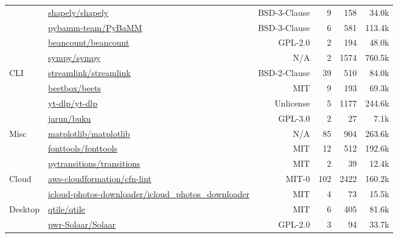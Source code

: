 {\begin{tabular}{llrrrr}
& \href{https://github.com/shapely/shapely}{shapely/shapely} & BSD-3-Clause & 9 & 158 & 34.0k \\
& \href{https://github.com/pybamm-team/PyBaMM}{pybamm-team/PyBaMM} & BSD-3-Clause & 6 & 581 & 113.4k \\
& \href{https://github.com/beancount/beancount}{beancount/beancount} & GPL-2.0 & 2 & 194 & 48.0k \\
& \href{https://github.com/sympy/sympy}{sympy/sympy} & N/A & 2 & 1574 & 760.5k \\
\midrule
\multirow{4}{*}{CLI} & \href{https://github.com/streamlink/streamlink}{streamlink/streamlink} & BSD-2-Clause & 39 & 510 & 84.0k \\
& \href{https://github.com/beetbox/beets}{beetbox/beets} & MIT & 9 & 193 & 69.3k \\
& \href{https://github.com/yt-dlp/yt-dlp}{yt-dlp/yt-dlp} & Unlicense & 5 & 1177 & 244.6k \\
& \href{https://github.com/jarun/buku}{jarun/buku} & GPL-3.0 & 2 & 27 & 7.1k \\
\midrule
\multirow{3}{*}{Misc} & \href{https://github.com/matplotlib/matplotlib}{matplotlib/matplotlib} & N/A & 85 & 904 & 263.6k \\
& \href{https://github.com/fonttools/fonttools}{fonttools/fonttools} & MIT & 12 & 512 & 192.6k \\
& \href{https://github.com/pytransitions/transitions}{pytransitions/transitions} & MIT & 2 & 39 & 12.4k \\
\midrule
\multirow{2}{*}{Cloud} & \href{https://github.com/aws-cloudformation/cfn-lint}{aws-cloudformation/cfn-lint} & MIT-0 & 102 & 2422 & 160.2k \\
& \href{https://github.com/icloud-photos-downloader/icloud\_photos\_downloader}{icloud-photos-downloader/icloud\_photos\_downloader} & MIT & 4 & 73 & 15.5k \\
\midrule
\multirow{2}{*}{Desktop} & \href{https://github.com/qtile/qtile}{qtile/qtile} & MIT & 6 & 405 & 81.6k \\
& \href{https://github.com/pwr-Solaar/Solaar}{pwr-Solaar/Solaar} & GPL-2.0 & 3 & 94 & 33.7k \\
\bottomrule
\end{tabular}
}